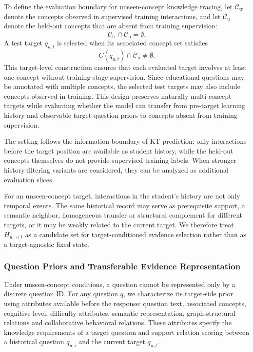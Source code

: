 \documentclass[a4paper,12pt]{article}
\numberwithin{table}{section}
\begin{document}
To define the evaluation boundary for unseen-concept knowledge tracing, let \(\mathcal{C}_{\mathrm{tr}}\) denote the concepts observed in supervised training interactions, and let \(\mathcal{C}_{\mathrm{u}}\) denote the held-out concepts that are absent from training supervision:
\[
\mathcal{C}_{\mathrm{tr}}\cap\mathcal{C}_{\mathrm{u}}=\emptyset .
\]
A test target \(q_{u,t}\) is selected when its associated concept set satisfies \[C(q_{u,t})\cap\mathcal{C}_{\mathrm{u}}\neq\emptyset .\] This target-level construction ensures that each evaluated target involves at least one concept without training-stage supervision. Since educational questions may be annotated with multiple concepts, the selected test targets may also include concepts observed in training. This design preserves naturally multi-concept targets while evaluating whether the model can transfer from pre-target learning history and observable target-question priors to concepts absent from training supervision.

The setting follows the information boundary of KT prediction: only interactions before the target position are available as student history, while the held-out concepts themselves do not provide supervised training labels. When stronger history-filtering variants are considered, they can be analyzed as additional evaluation slices.

For an unseen-concept target, interactions in the student's history are not only temporal events. The same historical record may serve as prerequisite support, a semantic neighbor, homogeneous transfer or structural complement for different targets, or it may be weakly related to the current target. We therefore treat \(H_{u,<t}\) as a candidate set for target-conditioned evidence selection rather than as a target-agnostic fixed state.

\subsubsection{Question Priors and Transferable Evidence Representation}

Under unseen-concept conditions, a question cannot be represented only by a discrete question ID. For any question \(q\), we characterize its target-side prior using attributes available before the response: question text, associated concepts, cognitive level, difficulty attributes, semantic representation, graph-structural relations and collaborative behavioral relations. These attributes specify the knowledge requirements of a target question and support relation scoring between a historical question \(q_{u,i}\) and the current target \(q_{u,t}\).
\end{document}
